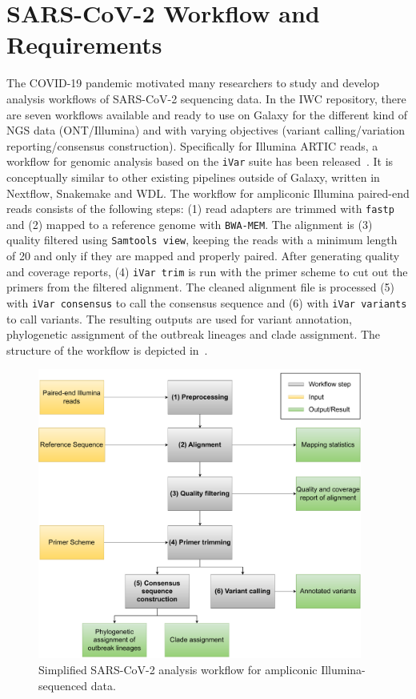 \section{SARS-CoV-2 Workflow and Requirements}
The \ac{COVID-19} pandemic motivated many researchers to study and develop analysis workflows of \ac{SARS-CoV-2} sequencing data. In the \ac{IWC} repository, there are seven workflows available and ready to use on Galaxy for the different kind of \ac{NGS} data (ONT/Illumina) and with varying objectives (variant calling/variation reporting/consensus construction). Specifically for Illumina ARTIC reads, a workflow for genomic analysis based on the \texttt{iVar} suite has been released~\cite{iwc2021covidivar}. It is conceptually similar to other existing pipelines outside of Galaxy, written in Nextflow, Snakemake and \ac{WDL}. The workflow for ampliconic Illumina paired-end reads consists of the following steps: (1) read adapters are trimmed with \texttt{fastp} and (2) mapped to a reference genome with \texttt{BWA-MEM}. The alignment is (3) quality filtered using \texttt{Samtools view}, keeping the reads with a minimum length of 20 and only if they are mapped and properly paired. After generating quality and coverage reports, (4) \texttt{iVar trim} is run with the primer scheme to cut out the primers from the filtered alignment. The cleaned alignment file is processed (5) with \texttt{iVar consensus} to call the consensus sequence and (6) with \texttt{iVar variants} to call variants. The resulting outputs are used for variant annotation, phylogenetic assignment of the outbreak lineages and clade assignment. The structure of the workflow is depicted in~. 

\begin{figure}[h!]
	\includegraphics[width=0.95\textwidth]{media/3-sars-cov-2.pdf}
	\caption{Simplified SARS-CoV-2 analysis workflow for ampliconic Illumina-sequenced data.}
	\label{fig:3-sars-wf}
\end{figure}

